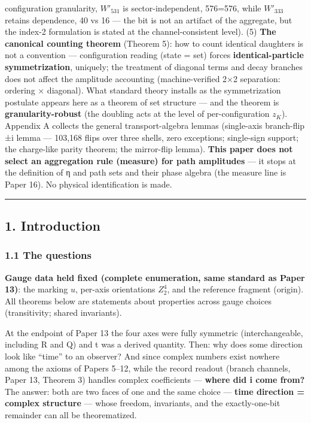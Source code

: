\documentclass[
]{ltjsarticle}
\begin{document}
configuration granularity, \(W'_{531}\) is sector-independent, 576=576,
while \(W'_{333}\) retains dependence, 40 vs 16 --- the bit is not an
artifact of the aggregate, but the index-2 formulation is stated at the
channel-consistent level). (5) \textbf{The canonical counting theorem}
(Theorem 5): how to count identical daughters is not a convention ---
configuration reading (state = set) forces \textbf{identical-particle
symmetrization}, uniquely; the treatment of diagonal terms and decay
branches does not affect the amplitude accounting (machine-verified 2×2
separation: ordering × diagonal). What standard theory installs as the
symmetrization postulate appears here as a theorem of set structure ---
and the theorem is \textbf{granularity-robust} (the doubling acts at the
level of per-configuration \(z_K\)). Appendix A collects the general
transport-algebra lemmas (single-axis branch-flip ±i lemma --- 103,168
flips over three shells, zero exceptions; single-sign support; the
charge-like parity theorem; the mirror-flip lemma). \textbf{This paper
does not select an aggregation rule (measure) for path amplitudes} ---
it stops at the definition of η and path sets and their phase algebra
(the measure line is Paper 16). No physical identification is made.

\begin{center}\rule{0.5\linewidth}{0.5pt}\end{center}

\subsection{1. Introduction}\label{introduction}

\subsubsection{1.1 The questions}\label{the-questions}

\textbf{Gauge data held fixed (complete enumeration, same standard as
Paper 13)}: the marking \(u\), per-axis orientations \(Z_2^{4}\), and
the reference fragment (origin). All theorems below are statements about
properties across gauge choices (transitivity; shared invariants).

At the endpoint of Paper 13 the four axes were fully symmetric
(interchangeable, including R and Q) and t was a derived quantity. Then:
why does some direction look like ``time'' to an observer? And since
complex numbers exist nowhere among the axioms of Papers 5--12, while
the record readout (branch channels, Paper 13, Theorem 3) handles
complex coefficients --- \textbf{where did i come from?} The answer:
both are two faces of one and the same choice --- \textbf{time direction
= complex structure} --- whose freedom, invariants, and the
exactly-one-bit remainder can all be theorematized.
\end{document}
